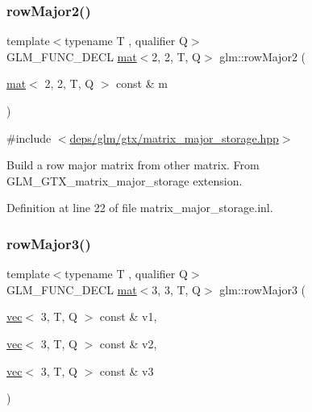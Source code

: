 \subsubsection{\texorpdfstring{row\+Major2()}{rowMajor2()}\hspace{0.1cm}{\footnotesize\ttfamily [2/2]}}
{\footnotesize\ttfamily template$<$typename T , qualifier Q$>$ \\
G\+L\+M\+\_\+\+F\+U\+N\+C\+\_\+\+D\+E\+CL \hyperlink{structglm_1_1mat}{mat}$<$2, 2, T, Q$>$ glm\+::row\+Major2 (\begin{DoxyParamCaption}\item[{\hyperlink{structglm_1_1mat}{mat}$<$ 2, 2, T, Q $>$ const \&}]{m }\end{DoxyParamCaption})}



{\ttfamily \#include $<$\hyperlink{matrix__major__storage_8hpp}{deps/glm/gtx/matrix\+\_\+major\+\_\+storage.\+hpp}$>$}

Build a row major matrix from other matrix. From G\+L\+M\+\_\+\+G\+T\+X\+\_\+matrix\+\_\+major\+\_\+storage extension. 

Definition at line 22 of file matrix\+\_\+major\+\_\+storage.\+inl.

\mbox{\label{group__gtx__matrix__major__storage_ga2ae46497493339f745754e40f438442e}} 
\subsubsection{\texorpdfstring{row\+Major3()}{rowMajor3()}\hspace{0.1cm}{\footnotesize\ttfamily [1/2]}}
{\footnotesize\ttfamily template$<$typename T , qualifier Q$>$ \\
G\+L\+M\+\_\+\+F\+U\+N\+C\+\_\+\+D\+E\+CL \hyperlink{structglm_1_1mat}{mat}$<$3, 3, T, Q$>$ glm\+::row\+Major3 (\begin{DoxyParamCaption}\item[{\hyperlink{structglm_1_1vec}{vec}$<$ 3, T, Q $>$ const \&}]{v1,  }\item[{\hyperlink{structglm_1_1vec}{vec}$<$ 3, T, Q $>$ const \&}]{v2,  }\item[{\hyperlink{structglm_1_1vec}{vec}$<$ 3, T, Q $>$ const \&}]{v3 }\end{DoxyParamCaption})}




